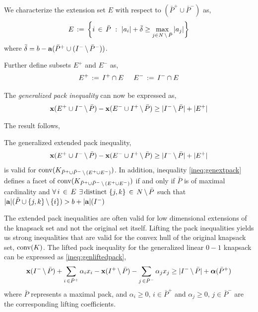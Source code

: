 \documentclass[10pt,twoside]{amsart}
\begin{document}
We characterize the extension set $E$ with respect to $(\bar{P}^+ \cup \bar{P}^-)$ as,
\begin{align}
\label{set:extplus}
    E \,:=\, \left\{ {i\,\in\, \bar{P}} \ : \ {|a_i| + \bar{\delta} \geq \underset{j\in N\,\backslash\, \bar{P}}{\max}\, |a_j|} \right\}
\end{align}
where $\bar{\delta} = b - \mathbf{a}(\bar{P}^+\cup (I^-\,\backslash\, \bar{P}^-))$.

Further define subsets $E^+$ and $E^-$ as,
\begin{align*}
  E^+ \,:=\, I^+ \cap E \hspace{5mm} E^- \,:=\, I^- \cap E
\end{align*}

The \emph{generalized pack inequality} can now be expressed as,
\begin{align*}
        \mathbf{x}(E^+ \cup I^-\,\backslash\, \bar{P}) - \mathbf{x}(E^- \cup I^+\,\backslash\, \bar{P}) \geq |I^-\,\backslash\, \bar{P}| + |E^+|
\end{align*}

The result follows,

\begin{prop}
\label{prop:genextpack}
  The generalized extended pack inequality,
  \begin{align}
    \label{ineq:genextpack}
    \mathbf{x}(E^+ \cup I^-\,\backslash\, \bar{P}) - \mathbf{x}(E^- \cup I^+\,\backslash\, \bar{P}) \geq |I^-\,\backslash\, \bar{P}| + |E^+|
  \end{align}
  is valid for $\operatorname{conv}(K_{\bar{P}^+\cup \bar{P}^-\,\backslash\, (E^+ \cup E^-)})$. In addition, inequality \eqref{ineq:genextpack} defines a facet of $\operatorname{conv}(K_{\bar{P}^+\cup \bar{P}^-\,\backslash\, (E^+ \cup E^-)})$ if and only if $\bar{P}$ is of maximal cardinality and $\forall\, i\,\in\, E$ $\exists\, \text{distinct }\{j,k\}\,\in\, N\,\backslash\, \bar{P}$ such that $|\mathbf{a}|(\bar{P}\cup \{j,k\}\,\backslash\, \{i\}) > b  + |\mathbf{a}|(I^-)$
\end{prop}

The extended pack inequalities are often valid for low dimensional extensions of the knapsack set and not the original set itself. Lifting the pack inequalities yields us strong inequalities that are valid for the convex hull of the original knapsack set, $\operatorname{conv}(K)$. The lifted pack inequality for the generalized linear $0-1$ knapsack can be expressed as \eqref{ineq:genliftedpack},
\begin{align*}
  \mathbf{x}(I^-\,\backslash\, \bar{P}) + \sum_{i\,\in \bar{P}^+} \alpha_i x_i - \mathbf{x}(I^+\,\backslash\, \bar{P}) - \sum_{j\,\in \bar{P}^-} \alpha_j {x}_j \geq |I^-\,\backslash\, \bar{P}| + \boldsymbol\alpha(\bar{P}^+)
\end{align*}
where $\bar{P}$ represents a maximal pack, and $\alpha_i \geq 0,\,i\in \bar{P}^+$ and $\alpha_j \geq 0,\,j\in \bar{P}^-$ are the corresponding lifting coefficients.
\end{document}
